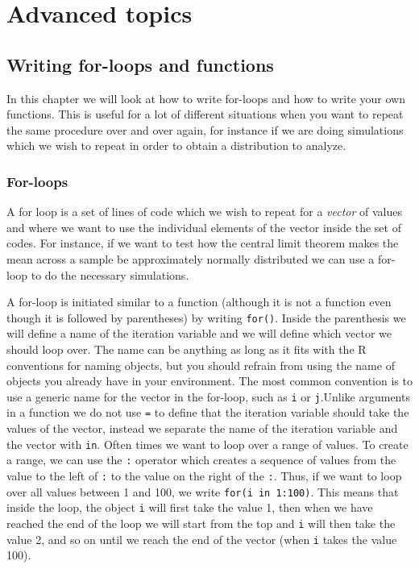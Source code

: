 \documentclass[
]{book}
\begin{document}
\hypertarget{part-advanced-topics}{%
\part{Advanced topics}\label{part-advanced-topics}}

\hypertarget{writing-for-loops-and-functions}{%
\chapter{Writing for-loops and functions}\label{writing-for-loops-and-functions}}

In this chapter we will look at how to write for-loops and how to write your own functions. This is useful for a lot of different situations when you want to repeat the same procedure over and over again, for instance if we are doing simulations which we wish to repeat in order to obtain a distribution to analyze.

\hypertarget{for-loops}{%
\section{For-loops}\label{for-loops}}

A for loop is a set of lines of code which we wish to repeat for a \emph{vector} of values and where we want to use the individual elements of the vector inside the set of codes. For instance, if we want to test how the central limit theorem makes the mean across a sample be approximately normally distributed we can use a for-loop to do the necessary simulations.

A for-loop is initiated similar to a function (although it is not a function even though it is followed by parentheses) by writing \texttt{for()}. Inside the parenthesis we will define a name of the iteration variable and we will define which vector we should loop over. The name can be anything as long as it fits with the R conventions for naming objects, but you should refrain from using the name of objects you already have in your environment. The most common convention is to use a generic name for the vector in the for-loop, such as \texttt{i} or \texttt{j}.Unlike arguments in a function we do not use \texttt{=} to define that the iteration variable should take the values of the vector, instead we separate the name of the iteration variable and the vector with \texttt{in}. Often times we want to loop over a range of values. To create a range, we can use the \texttt{:} operator which creates a sequence of values from the value to the left of \texttt{:} to the value on the right of the \texttt{:}. Thus, if we want to loop over all values between 1 and 100, we write \texttt{for(i\ in\ 1:100)}. This means that inside the loop, the object \texttt{i} will first take the value 1, then when we have reached the end of the loop we will start from the top and \texttt{i} will then take the value 2, and so on until we reach the end of the vector (when \texttt{i} takes the value 100).
\end{document}

